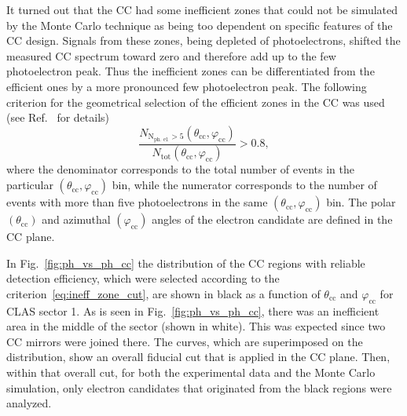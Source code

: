 \documentclass[prc,twocolumn,superscriptaddress,showpacs,amssymb,amsmath,amsfonts,aps,nofootinbib]{revtex4-1}
\begin{document}
It turned out that the CC had some inefficient zones  that could not be simulated by the Monte Carlo technique as being too dependent on specific features of the CC design.
Signals from these zones, being depleted of photoelectrons, shifted the measured CC spectrum toward zero and therefore add up to the few photoelectron peak. Thus the inefficient zones can be differentiated from the efficient ones by a more pronounced few photoelectron peak.
The following criterion for the geometrical selection of the efficient zones in the CC was used (see Ref.~\cite{Fed_an_note:2017} for details)  
\begin{equation}
\frac{N_{\text{N}_{\text{ph. el.}}>5}(\theta_{\text{cc}},\varphi_{\text{cc}})}{N_{\text{tot}}(\theta_{\text{cc}},\varphi_{\text{cc}})} > 0.8,
\label{eq:ineff_zone_cut}
\end{equation}
where the denominator corresponds to the total number of events in the particular $(\theta_{\text{cc}},\varphi_{\text{cc}})$ bin, while the numerator corresponds to the number of events with more than five photoelectrons in the same $(\theta_{\text{cc}},\varphi_{\text{cc}})$ bin. The polar $(\theta_{\text{cc}})$ and azimuthal $(\varphi_{\text{cc}})$ angles of the electron candidate are defined in the CC plane.

In Fig.~\ref{fig:ph_vs_ph_cc} the distribution of the CC regions with reliable detection efficiency, which were selected according to the criterion~\eqref{eq:ineff_zone_cut}, are shown in black as a function of $\theta_{\text{cc}}$ and $\varphi_{\text{cc}}$ for CLAS sector 1. As is seen in Fig.~\ref{fig:ph_vs_ph_cc}, there was an inefficient area in the middle of the sector (shown in white). This was expected since two CC mirrors were joined there. The curves, which are superimposed on the distribution,  show an overall fiducial cut that is applied in the CC plane. Then, within that overall cut, for both the experimental data and the Monte Carlo simulation, only electron candidates that originated from the black regions were analyzed.
\end{document}
